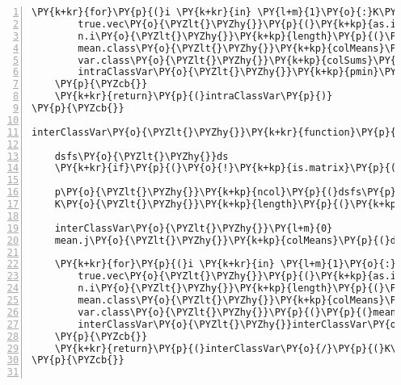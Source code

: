 \begin{Verbatim}[commandchars=\\\{\},codes={\catcode`\$=3\catcode`\^=7\catcode`\_=8},gobble=0,numbers=left,fontfamily=fvm,fontshape=n,fontsize=\footnotesize,tabsize=2]
	\PY{k+kr}{for}\PY{p}{(}i \PY{k+kr}{in} \PY{l+m}{1}\PY{o}{:}K\PY{p}{)}\PY{p}{\PYZob{}}
		true.vec\PY{o}{\PYZlt{}\PYZhy{}}\PY{p}{(}\PY{k+kp}{as.integer}\PY{p}{(}class.vec\PY{p}{)}\PY{o}{==}i\PY{p}{)}
		n.i\PY{o}{\PYZlt{}\PYZhy{}}\PY{k+kp}{length}\PY{p}{(}\PY{k+kp}{which}\PY{p}{(}true.vec\PY{p}{)}\PY{p}{)}
		mean.class\PY{o}{\PYZlt{}\PYZhy{}}\PY{k+kp}{colMeans}\PY{p}{(}\PY{k+kp}{as.matrix}\PY{p}{(}dsfs\PY{p}{[}true.vec\PY{p}{,}\PY{p}{]}\PY{p}{,}ncol\PY{o}{=}p\PY{p}{)}\PY{p}{)}
		var.class\PY{o}{\PYZlt{}\PYZhy{}}\PY{k+kp}{colSums}\PY{p}{(}\PY{k+kp}{as.matrix}\PY{p}{(}\PY{p}{(}dsfs\PY{p}{[}true.vec\PY{p}{,}\PY{p}{]}\PY{o}{\PYZhy{}}\PY{k+kp}{rep}\PY{p}{(}mean.class\PY{p}{,}each\PY{o}{=}n.i\PY{p}{)}\PY{p}{)}\PY{o}{\PYZca{}}\PY{l+m}{2}\PY{p}{,}ncol\PY{o}{=}p\PY{p}{)}\PY{p}{)}
		intraClassVar\PY{o}{\PYZlt{}\PYZhy{}}\PY{k+kp}{pmin}\PY{p}{(}intraClassVar\PY{p}{,}var.class\PY{o}{/}\PY{p}{(}n.i\PY{l+m}{\PYZhy{}1}\PY{p}{)}\PY{p}{)}
	\PY{p}{\PYZcb{}}
	\PY{k+kr}{return}\PY{p}{(}intraClassVar\PY{p}{)}
\PY{p}{\PYZcb{}}

interClassVar\PY{o}{\PYZlt{}\PYZhy{}}\PY{k+kr}{function}\PY{p}{(}ds\PY{p}{,}class.vec\PY{p}{)}\PY{p}{\PYZob{}}

	dsfs\PY{o}{\PYZlt{}\PYZhy{}}ds
	\PY{k+kr}{if}\PY{p}{(}\PY{o}{!}\PY{k+kp}{is.matrix}\PY{p}{(}dsfs\PY{p}{)}\PY{p}{)} dsfs\PY{o}{\PYZlt{}\PYZhy{}}\PY{k+kp}{data.matrix}\PY{p}{(}dsfs\PY{p}{)}  
	
	p\PY{o}{\PYZlt{}\PYZhy{}}\PY{k+kp}{ncol}\PY{p}{(}dsfs\PY{p}{)}
	K\PY{o}{\PYZlt{}\PYZhy{}}\PY{k+kp}{length}\PY{p}{(}\PY{k+kp}{levels}\PY{p}{(}class.vec\PY{p}{)}\PY{p}{)}
	
	interClassVar\PY{o}{\PYZlt{}\PYZhy{}}\PY{l+m}{0}
	mean.j\PY{o}{\PYZlt{}\PYZhy{}}\PY{k+kp}{colMeans}\PY{p}{(}dsfs\PY{p}{)}
	
	\PY{k+kr}{for}\PY{p}{(}i \PY{k+kr}{in} \PY{l+m}{1}\PY{o}{:}K\PY{p}{)}\PY{p}{\PYZob{}}
		true.vec\PY{o}{\PYZlt{}\PYZhy{}}\PY{p}{(}\PY{k+kp}{as.integer}\PY{p}{(}class.vec\PY{p}{)}\PY{o}{==}i\PY{p}{)}
		n.i\PY{o}{\PYZlt{}\PYZhy{}}\PY{k+kp}{length}\PY{p}{(}\PY{k+kp}{which}\PY{p}{(}true.vec\PY{p}{)}\PY{p}{)}
		mean.class\PY{o}{\PYZlt{}\PYZhy{}}\PY{k+kp}{colMeans}\PY{p}{(}\PY{k+kp}{as.matrix}\PY{p}{(}dsfs\PY{p}{[}true.vec\PY{p}{,}\PY{p}{]}\PY{p}{,}ncol\PY{o}{=}p\PY{p}{)}\PY{p}{)}
		var.class\PY{o}{\PYZlt{}\PYZhy{}}\PY{p}{(}\PY{p}{(}mean.j\PY{o}{\PYZhy{}}mean.class\PY{p}{)}\PY{o}{\PYZca{}}\PY{l+m}{2}\PY{p}{)}
		interClassVar\PY{o}{\PYZlt{}\PYZhy{}}interClassVar\PY{o}{+}var.class
	\PY{p}{\PYZcb{}}
	\PY{k+kr}{return}\PY{p}{(}interClassVar\PY{o}{/}\PY{p}{(}K\PY{l+m}{\PYZhy{}1}\PY{p}{)}\PY{p}{)}
\PY{p}{\PYZcb{}}


\end{Verbatim}
